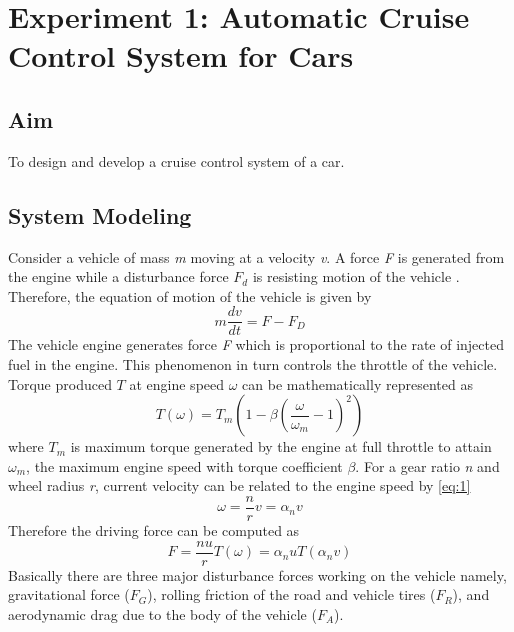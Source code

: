 \newappendix\label{thirdappendix}
\section{Experiment 1: Automatic Cruise Control System for Cars\cite{Murray2009}}
\subsection{Aim}
To design and develop a cruise control system of a car.
\subsection{System Modeling}
Consider a vehicle of mass \textit{m} moving at a velocity \textit{v}. A force \textit{F} is generated from the engine while a disturbance force $ F_d $ is resisting motion of the vehicle \cite{Murray2009,koruba2012classical}. Therefore, the equation of motion of the vehicle is given by
\begin{equation} \label{eq:force}
m\frac{{dv}}{{dt}} = F - {F_D}
\end{equation}
The vehicle engine generates force \textit{F} which is proportional to the rate of injected fuel in the engine. This phenomenon in turn controls the throttle of the vehicle. Torque produced $ T $ at engine speed $ \omega $ can be mathematically represented as
\begin{equation}
T\left( \omega  \right) = {T_m}\left( {1 - \beta {{\left( {\frac{\omega }{{{\omega _m}}} - 1} \right)}^2}} \right)
\end{equation} 
where $ T_m $ is maximum torque generated by the engine at full throttle to attain $ \omega _m $, the maximum engine speed with torque coefficient $ \beta $. For a gear ratio \textit{n} and wheel radius \textit{r}, current velocity can be related to the engine speed by \eqref{eq:1}
\begin{equation} \label{eq:xx1}
\omega  = \frac{n}{r}v = {\alpha _n}v
\end{equation}
Therefore the driving force can be computed as
\begin{equation} \label{eq:F}
F = \frac{{nu}}{r}T\left( \omega  \right) = {\alpha _n}uT\left( {{\alpha _n}v} \right)
\end{equation}
Basically there are three major disturbance forces working on the vehicle namely, gravitational force ($ F_G $), rolling friction of the road and vehicle tires ($ F_R $), and aerodynamic drag due to the body of the vehicle ($ F_A $).
